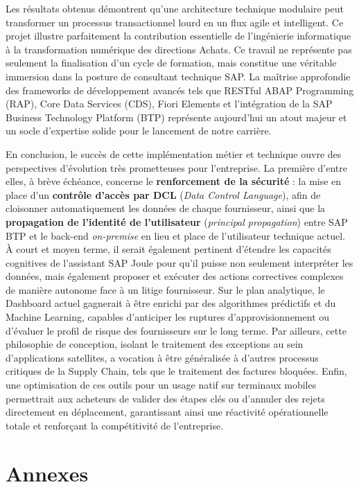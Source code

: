 \documentclass[12pt,a4paper,oneside]{report}
\begin{document}
Les résultats obtenus démontrent qu'une architecture technique modulaire peut transformer un processus transactionnel lourd en un flux agile et intelligent. Ce projet illustre parfaitement la contribution essentielle de l'ingénierie informatique à la transformation numérique des directions Achats. Ce travail ne représente pas seulement la finalisation d'un cycle de formation, mais constitue une véritable immersion dans la posture de consultant technique SAP. La maîtrise approfondie des frameworks de développement avancés tels que RESTful ABAP Programming (RAP), Core Data Services (CDS), Fiori Elements et l'intégration de la SAP Business Technology Platform (BTP) représente aujourd'hui un atout majeur et un socle d'expertise solide pour le lancement de notre carrière.

En conclusion, le succès de cette implémentation métier et technique ouvre des perspectives d'évolution très prometteuses pour l'entreprise. La première d'entre elles, à brève échéance, concerne le \textbf{renforcement de la sécurité} : la mise en place d'un \textbf{contrôle d'accès par DCL} (\textit{Data Control Language}), afin de cloisonner automatiquement les données de chaque fournisseur, ainsi que la \textbf{propagation de l'identité de l'utilisateur} (\textit{principal propagation}) entre SAP BTP et le back-end \textit{on-premise} en lieu et place de l'utilisateur technique actuel. À court et moyen terme, il serait également pertinent d'étendre les capacités cognitives de l'assistant SAP Joule pour qu'il puisse non seulement interpréter les données, mais également proposer et exécuter des actions correctives complexes de manière autonome face à un litige fournisseur. Sur le plan analytique, le Dashboard actuel gagnerait à être enrichi par des algorithmes prédictifs et du Machine Learning, capables d'anticiper les ruptures d'approvisionnement ou d'évaluer le profil de risque des fournisseurs sur le long terme. Par ailleurs, cette philosophie de conception, isolant le traitement des exceptions au sein d'applications satellites, a vocation à être généralisée à d'autres processus critiques de la Supply Chain, tels que le traitement des factures bloquées. Enfin, une optimisation de ces outils pour un usage natif sur terminaux mobiles permettrait aux acheteurs de valider des étapes clés ou d'annuler des rejets directement en déplacement, garantissant ainsi une réactivité opérationnelle totale et renforçant la compétitivité de l'entreprise.

\chapter*{Annexes}
{}
\label{ch:annexes}
\end{document}

